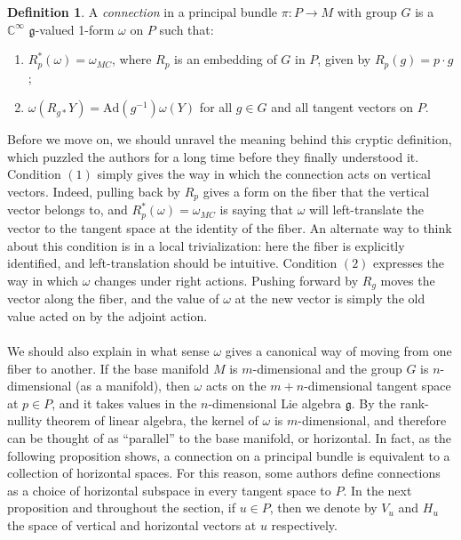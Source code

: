 \documentclass{book}
\newcommand{\C}{\mathbb{C}}
\newcommand{\fr}{\mathfrak}
\theoremstyle{plain}
\theoremstyle{definition}
\newtheorem{defn}{Definition}
\theoremstyle{remark}
\begin{document}
\begin{defn}
    A \emph{connection} in a principal bundle $\pi: P \to M$ with group $G$ is a $\C^{\infty}$ $\fr g$-valued 1-form $\omega$ on $P$ such that:
    \begin{enumerate}[(1)]
        \item $R_p^*(\omega) = \omega_{MC}$, where $R_p$ is an embedding of $G$ in $P$, given by $R_p(g) = p \cdot g$;
        \item $\omega(R_{g*} Y) = \text{Ad}(g^{-1})\omega(Y)$ for all $g\in G$ and all tangent vectors on $P$.
    \end{enumerate}
\end{defn}
Before we move on, we should unravel the meaning behind this cryptic definition, which puzzled the authors for a long time before they finally understood it. Condition $(1)$ simply gives the way in which the connection acts on vertical vectors. Indeed, pulling back by $R_p$ gives a form on the fiber that the vertical vector belongs to, and $R_p^*(\omega) = \omega_{MC}$ is saying that $\omega$ will left-translate the vector to the tangent space at the identity of the fiber. An alternate way to think about this condition is in a local trivialization: here the fiber is explicitly identified, and left-translation should be intuitive. Condition $(2)$ expresses the way in which $\omega$ changes under right actions. Pushing forward by $R_g$ moves the vector along the fiber, and the value of $\omega$ at the new vector is simply the old value acted on by the adjoint action.
\\
\\
We should also explain in what sense $\omega$ gives a canonical way of moving from one fiber to another. If the base manifold $M$ is $m$-dimensional and the group $G$ is $n$-dimensional (as a manifold), then $\omega$ acts on the $m+n$-dimensional tangent space at $p\in P$, and it takes values in the $n$-dimensional Lie algebra $\fr g$. By the rank-nullity theorem of linear algebra, the kernel of $\omega$ is $m$-dimensional, and therefore can be thought of as ``parallel'' to the base manifold, or horizontal. In fact, as the following proposition shows, a connection on a principal bundle is equivalent to a collection of horizontal spaces. For this reason, some authors define connections as a choice of horizontal subspace in every tangent space to $P$. In the next proposition and throughout the section, if $u\in P$, then we denote by $V_u$ and $H_u$ the space of vertical and horizontal vectors at $u$ respectively.
\end{document}
